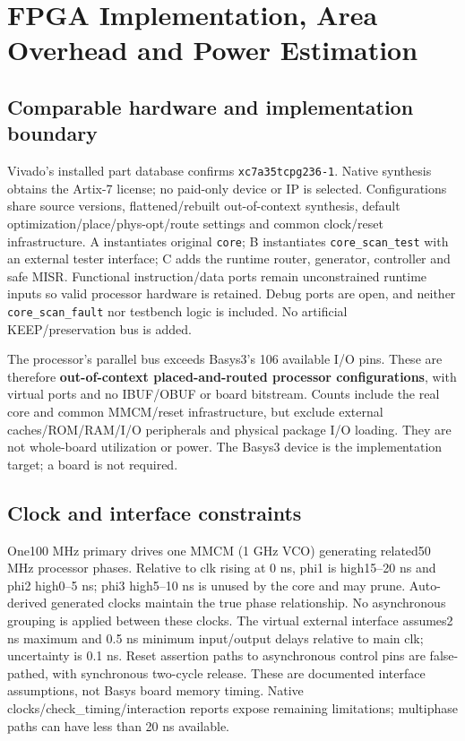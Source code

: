 \documentclass[11pt,a4paper]{article}
\begin{document}
\section{FPGA Implementation, Area Overhead and Power Estimation}


\subsection{Comparable hardware and implementation boundary}


Vivado's installed part database confirms \texttt{xc7a35tcpg236-1}. Native synthesis obtains the Artix-7 license; no paid-only device or IP is selected. Configurations share source versions, flattened/rebuilt out-of-context synthesis, default optimization/place/phys-opt/route settings and common clock/reset infrastructure. A instantiates original \texttt{core}; B instantiates \texttt{core\_scan\_test} with an external tester interface; C adds the runtime router, generator, controller and safe MISR. Functional instruction/data ports remain unconstrained runtime inputs so valid processor hardware is retained. Debug ports are open, and neither \texttt{core\_scan\_fault} nor testbench logic is included. No artificial KEEP/preservation bus is added.



The processor's parallel bus exceeds Basys3's 106 available I/O pins. These are therefore \textbf{out-of-context placed-and-routed processor configurations}, with virtual ports and no IBUF/OBUF or board bitstream. Counts include the real core and common MMCM/reset infrastructure, but exclude external caches/ROM/RAM/I/O peripherals and physical package I/O loading. They are not whole-board utilization or power. The Basys3 device is the implementation target; a board is not required.



\subsection{Clock and interface constraints}


One100 MHz primary drives one MMCM (1 GHz VCO) generating related50 MHz processor phases. Relative to clk rising at 0 ns, phi1 is high15--20 ns and phi2 high0--5 ns; phi3 high5--10 ns is unused by the core and may prune. Auto-derived generated clocks maintain the true phase relationship. No asynchronous grouping is applied between these clocks. The virtual external interface assumes2 ns maximum and 0.5 ns minimum input/output delays relative to main clk; uncertainty is 0.1 ns. Reset assertion paths to asynchronous control pins are false-pathed, with synchronous two-cycle release. These are documented interface assumptions, not Basys board memory timing. Native clocks/check\_timing/interaction reports expose remaining limitations; multiphase paths can have less than 20 ns available.
\end{document}

